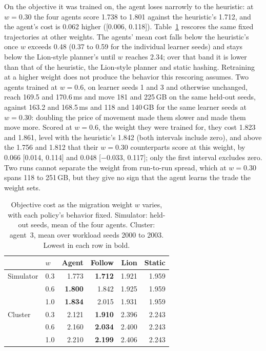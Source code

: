 On the objective it was trained on, the agent loses narrowly to the heuristic:
at $w=0.30$ the four agents score 1.738 to 1.801 against the heuristic's 1.712,
and the agent's cost is 0.062 higher ([0.006, 0.118]).
Table~\ref{tab:weight} rescores the same fixed trajectories at other weights.
The agents' mean cost falls below the heuristic's once $w$ exceeds 0.48 (0.37
to 0.59 for the individual learner seeds) and stays below the Lion-style
planner's until $w$ reaches 2.34; over that band it is lower than that of the
heuristic, the Lion-style planner and static hashing. Retraining at a higher
weight does not produce the behavior this rescoring assumes. Two agents trained
at $w=0.6$, on learner seeds 1 and 3 and otherwise unchanged, reach 169.5 and
170.6\,ms and move 181 and 225\,GB on the same held-out seeds, against 163.2 and
168.5\,ms and 118 and 140\,GB for the same learner seeds at $w=0.30$: doubling
the price of movement made them slower and made them move more. Scored at
$w=0.6$, the weight they were trained for, they cost 1.823 and 1.861, level with
the heuristic's 1.842 (both intervals include zero), and above the 1.756 and
1.812 that their $w=0.30$ counterparts score at this weight, by 0.066 [0.014,
0.114] and 0.048 [$-0.033$, 0.117]; only the first interval excludes zero. Two
runs cannot separate the weight from run-to-run spread, which at $w=0.30$ spans
118 to 251\,GB, but they give no sign that the agent learns the trade the
weight sets.

\begin{table}[t]
\caption{Objective cost as the migration weight $w$ varies, with each
policy's behavior fixed. Simulator: held-out seeds, mean of the four agents.
Cluster: agent~3, mean over workload seeds 2000 to 2003. Lowest in each row in
bold.}
\label{tab:weight}
\centering
\small
\begin{tabular}{llrrrr}
\toprule
 & $w$ & Agent & Follow & Lion & Static \\
\midrule
Simulator & 0.3 & 1.773 & \textbf{1.712} & 1.921 & 1.959 \\
          & 0.6 & \textbf{1.800} & 1.842 & 1.925 & 1.959 \\
          & 1.0 & \textbf{1.834} & 2.015 & 1.931 & 1.959 \\
\addlinespace
Cluster   & 0.3 & 2.121 & \textbf{1.910} & 2.396 & 2.243 \\
          & 0.6 & 2.160 & \textbf{2.034} & 2.400 & 2.243 \\
          & 1.0 & 2.210 & \textbf{2.199} & 2.406 & 2.243 \\
\bottomrule
\end{tabular}
\end{table}

